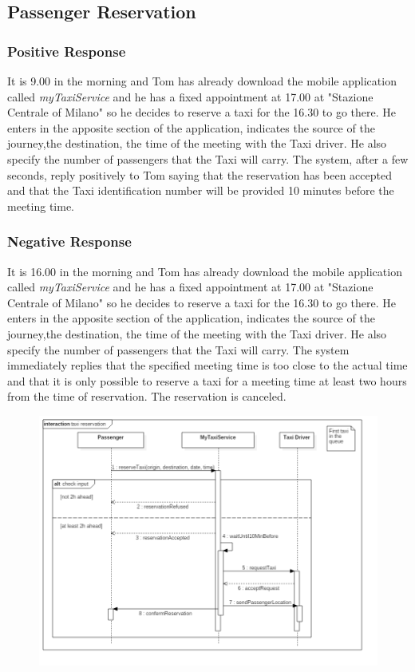 \subsection{Passenger Reservation}
\subsubsection{Positive Response}
It is 9.00 in the morning and Tom has already download the mobile application called \textit{myTaxiService} and he has a fixed appointment at 17.00 at "Stazione Centrale of Milano" so he decides to reserve a taxi for the 16.30 to go there. He enters in the apposite section of the application, indicates the source of the journey,the destination, the time of the meeting with the Taxi driver. He also specify the number of passengers that the Taxi will carry. The system, after a few seconds, reply positively to Tom saying that the reservation has been accepted and that the Taxi identification number will be provided 10 minutes before the meeting time.



\subsubsection{Negative Response}
It is 16.00 in the morning and Tom has already download the mobile application called \textit{myTaxiService} and he has a fixed appointment at 17.00 at "Stazione Centrale of Milano" so he decides to reserve a taxi for the 16.30 to go there. He enters in the apposite section of the application, indicates the source of the journey,the destination, the time of the meeting with the Taxi driver. He also specify the number of passengers that the Taxi will carry.
The system immediately replies that the specified meeting time is too close to the actual time and that it is only possible to reserve a taxi for a meeting time at least two hours from the time of reservation. The reservation is canceled.

\begin{figure}[H]
\centering
\includegraphics[scale=0.5]{Images/sequence_taxi_reservation}
\end{figure}


